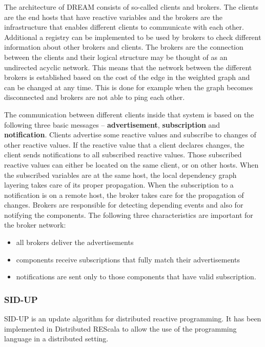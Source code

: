 \documentclass{sigplanconf}
\begin{document}
The architecture of DREAM consists of so-called clients and brokers. The clients are the end hosts that have reactive variables and the brokers are the infrastructure that enables different clients to communicate with each other. Additional a registry can be implemented to be used by brokers to check different information about other brokers and clients. The brokers are the connection between the clients and their logical structure may be thought of as an undirected acyclic network. This means that the network between the different brokers is established based on the cost of the edge in the weighted graph and can be changed at any time. This is done for example when the graph becomes disconnected and brokers are not able to ping each other.

The communication between different clients inside that system is based on the following three basic messages -- \textbf{advertisement}, \textbf{subscription} and \textbf{notification}.
Clients advertise some reactive values and subscribe to changes of other reactive values. If the reactive value that a client declares changes, the client sends notifications to all subscribed reactive values. Those subscribed reactive values can either be located on the same client, or on other hosts. When the subscribed variables are at the same host, the local dependency graph layering takes care of its proper propagation. When the subscription to a notification is on a remote host, the broker takes care for the propagation of changes. Brokers are responsible for detecting depending events and also for notifying the components. The following three characteristics are important for the broker network:

\begin{itemize}
\item all brokers deliver the advertisements
\item components receive subscriptions that fully match their advertisements
\item notifications are sent only to those components that have valid subscription.
\end{itemize}

\subsubsection{SID-UP}
SID-UP \cite{sidup} is an update algorithm for distributed reactive programming. It has been implemented in Distributed REScala to allow the use of the programming language in a distributed setting.
\end{document}
